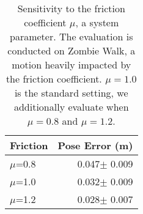 \begin{table}[!h]
\caption{ {Sensitivity to the friction coefficient $\mu$, a system parameter. The evaluation is conducted on Zombie Walk, a motion heavily impacted by the friction coefficient. $\mu=1.0$ is the standard setting, we additionally evaluate when $\mu=0.8$ and $\mu=1.2$.}}
\label{tab:friction}
\begin{center}
\begin{tabular}{l|r}
\toprule
Friction &
Pose Error (m)\\
\midrule
$\mu$=0.8 &
0.047$\pm$ 0.009 \\
$\mu$=1.0 & 
0.032$\pm$ 0.009 \\
$\mu$=1.2 & 
0.028$\pm$ 0.007 \\
\bottomrule
\end{tabular}
\end{center}
\end{table}